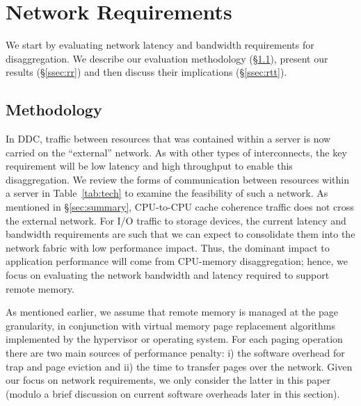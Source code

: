 \section{Network Requirements}
\label{sec:requirements}
We start by evaluating network latency and bandwidth requirements for disaggregation.
We describe our evaluation methodology (\S \ref{ssec:rmethod}), present our results (\S \ref{ssec:rr}) and then discuss their implications (\S \ref{ssec:rtt}). 

\subsection{Methodology}
\label{ssec:rmethod}
In DDC, traffic between resources that was contained within a server is now carried on the ``external'' network. As with other types of interconnects, the key requirement will be low latency and high throughput to enable this disaggregation. We review the forms of communication between resources within a server in Table~\ref{tab:tech} to examine the feasibility of such a network. As mentioned in \S\ref{sec:summary}, CPU-to-CPU cache coherence traffic does not cross the external network.
For I/O traffic to storage devices, the current latency and bandwidth requirements are such that we can expect to consolidate them into the network fabric with low performance impact. 
Thus, the dominant impact to application performance will come from CPU-memory disaggregation; hence, we focus on evaluating the network bandwidth and latency required to support remote memory. 

As mentioned earlier, we assume that remote memory is managed at the page granularity, in conjunction with virtual memory page replacement algorithms implemented by the hypervisor or operating system.
For each paging operation there are two main sources 
of performance penalty: i) the software overhead for trap and page eviction and ii) the time to transfer pages over the network. 
Given our focus on network requirements, we only consider the latter in this paper (modulo a brief discussion on current 
software overheads later in this section).

